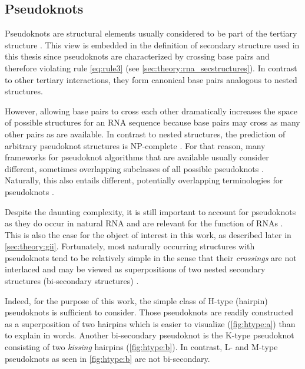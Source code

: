 \documentclass[../../master.tex]{subfiles}
\begin{document}
\subsection{Pseudoknots}
\label{sub:theory:pseudoknots}

Pseudoknots are structural elements usually considered to be part of the tertiary structure \parencite{hofacker_rna_2006}.
This view is embedded in the definition of secondary structure used in this thesis since pseudoknots are characterized by crossing base pairs and therefore violating rule \ref{eq:rule3} (see \autoref{sec:theory:rna_secstructures}).
In contrast to other tertiary interactions, they form canonical base pairs analogous to nested structures.

However, allowing base pairs to cross each other dramatically increases the space of possible structures for an RNA sequence because base pairs may cross as many other pairs as are available.
In contrast to nested structures, the prediction of arbitrary pseudoknot structures is NP-complete \parencite{lyngso_rna_2000}.
For that reason, many frameworks for pseudoknot algorithms that are available usually consider different, sometimes overlapping subclasses of all possible pseudoknots \parencite{fallmann_recent_2017}.
Naturally, this also entails different, potentially overlapping terminologies for pseudoknots \parencite{ponty_combinatorial_2011, mohl_lifting_2010, reidys_combinatorial_2011}.

Despite the daunting complexity, it is still important to account for pseudoknots as they do occur in natural RNA and are relevant for the function of RNAs \parencite{janssen_investigating_2011, haslinger_rna_1999}.
This is also the case for the object of interest in this work, as described later in \autoref{sec:theory:gii}.
Fortunately, most naturally occurring structures with pseudoknots tend to be relatively simple in the sense that their \emph{crossings} are not interlaced and may be viewed as superpositions of two nested secondary structures (bi-secondary structures) \parencite{haslinger_rna_1999}.

Indeed, for the purpose of this work, the simple class of H-type (hairpin) pseudoknots is sufficient to consider.
Those pseudoknots are readily constructed as a superposition of two hairpins which is easier to visualize (\autoref{fig:htype:a}) than to explain in words.
Another bi-secondary pseudoknot is the K-type pseudoknot consisting of two \emph{kissing} hairpins (\autoref{fig:htype:b}).
In contrast, L- and M-type pseudoknots as seen in \autoref{fig:htype:b} are not bi-secondary.
\end{document}
